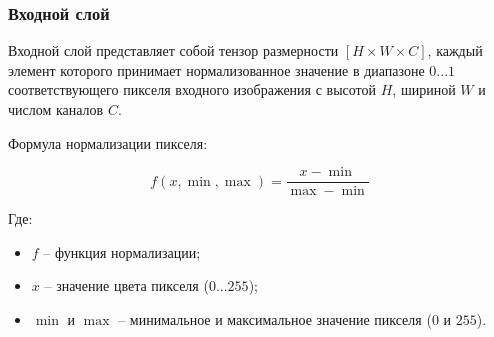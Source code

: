 \subsubsection{Входной слой}

Входной слой представляет собой тензор размерности $\left[H\times W\times C\right]$, каждый элемент которого принимает нормализованное значение в диапазоне $0...1$ соответствующего пикселя входного изображения с высотой $H$, шириной $W$ и числом каналов $C$. 

Формула нормализации пикселя:

$$
f(x, \min, \max) = \frac{x-\min}{\max - \min}
$$

Где:
\begin{itemize}
    \item $f$ -- функция нормализации;
    \item $x$ -- значение цвета пикселя ($0...255$);
    \item $\min$ и $\max$ -- минимальное и максимальное значение пикселя ($0$ и $255$).
\end{itemize}